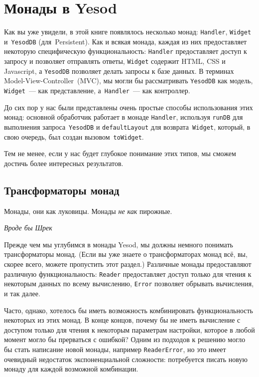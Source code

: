 \chapter{Монады в Yesod}\label{chap:yesod_monads}

Как вы уже увидели, в этой книге появлялось несколько монад:
\lstinline'Handler', \lstinline'Widget' и~\lstinline'YesodDB' (для~Persistent).
Как и всякая монада, каждая из них предоставляет некоторую специфическую
функциональность: \lstinline'Handler' предоставляет доступ к запросу и позволяет
отправлять ответы, \lstinline'Widget' содержит HTML, CSS и Javascript, а
\lstinline'YesodDB' позволяет делать запросы к базе данных. В терминах
Model-View-Controller~(MVC), мы могли бы рассматривать \lstinline'YesodDB' как
модель, \lstinline'Widget'~--- как представление, а~\lstinline'Handler'~--- как
контроллер.

До сих пор у нас были представлены очень простые способы использования этих
монад: основной обработчик работает в монаде \lstinline'Handler', используя
\lstinline'runDB' для выполнения запроса~\lstinline'YesodDB' и
\lstinline'defaultLayout' для возврата~\lstinline'Widget', который, в свою
очередь, был создан вызовом~\lstinline'toWidget'.

Тем не менее, если у нас будет глубокое понимание этих типов, мы сможем достичь
более интересных результатов.

\section{Трансформаторы монад}
\hfill \begin{minipage}[h]{0.45\textwidth}
    \small
    Монады, они как луковицы. Монады \emph{не как} пирожные.
    \begin{flushright}
        \emph{Вроде бы Шрек}
    \end{flushright}
\end{minipage}
\vspace{2em}

Прежде чем мы углубимся в монады Yesod, мы должны немного понимать
трансформаторы монад.  (Если вы уже знаете о трансформаторах монад всё, вы,
скорее всего, можете пропустить этот раздел.) Различные монады предоставляют
различную функциональность: \lstinline'Reader' предоставляет доступ только для
чтения к некоторым данных по всему вычислению, \lstinline'Error' позволяет
обрывать вычисления, и так далее.

Часто, однако, хотелось бы иметь возможность комбинировать функциональность
некоторых из этих монад. В конце концов, почему бы не иметь вычисление с
доступом только для чтения к некоторым параметрам настройки, которое в любой
момент могло бы прерваться с ошибкой? Одним из подходов к решению могло бы стать
написание новой монады, например \lstinline'ReaderError', но это имеет очевидный
недостаток экспоненциальной сложности: потребуется писать новую монаду для
каждой возможной комбинации.

